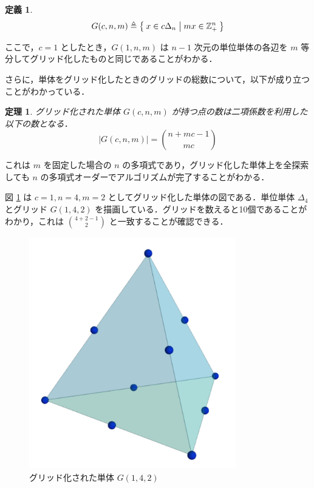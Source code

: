 \documentclass[a4paper,11pt]{jreport}
\newtheorem{definition}{定義}
\newtheorem{theorem}{定理}
\begin{document}
\begin{definition}
$$ G(c, n, m) \triangleq \Set{x \in c \Delta_n | mx \in \mathbb{Z}_+^n} $$
\end{definition}

ここで，$ c = 1 $ としたとき，$ G(1, n, m) $ は $ n - 1 $ 次元の単位単体の各辺を $ m $ 等分してグリッド化したものと同じであることがわかる．\par
さらに，単体をグリッド化したときのグリッドの総数について，以下が成り立つことがわかっている．

\begin{theorem} \label{thm:n_grid}
グリッド化された単体 $ G(c, n, m) $ が持つ点の数は二項係数を利用した以下の数となる．
$$ | G(c, n, m) | = \binom{n + mc - 1}{mc} $$
\end{theorem}

これは $ m $ を固定した場合の $ n $ の多項式であり，グリッド化した単体上を全探索しても $ n $ の多項式オーダーでアルゴリズムが完了することがわかる．\par
図 \ref{fig:grid_simplex} は $ c=1, n=4, m=2 $ としてグリッド化した単体の図である．単位単体 $ \Delta_4 $ とグリッド $ G(1, 4, 2) $ を描画している．グリッドを数えると10個であることがわかり，これは $ \binom{4 + 2 - 1}{2} $ と一致することが確認できる．\par

\begin{figure}
\begin{center}
\includegraphics[width=9cm]{graphs/grid_simplex.pdf}
\caption{グリッド化された単体 $ G(1, 4, 2) $}
\label{fig:grid_simplex}
\end{center}
\end{figure}
\end{document}
